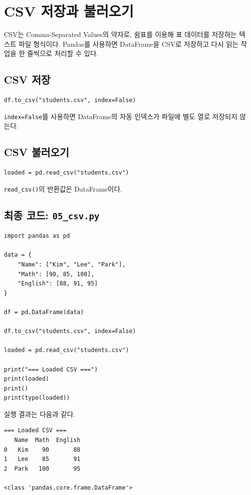 \documentclass[11pt,a4paper]{article}
\begin{document}
\section{CSV 저장과 불러오기}

CSV는 Comma-Separated Values의 약자로, 쉼표를 이용해 표 데이터를 저장하는 텍스트 파일 형식이다. Pandas를 사용하면 DataFrame을 CSV로 저장하고 다시 읽는 작업을 한 줄씩으로 처리할 수 있다.

\subsection{CSV 저장}

\begin{lstlisting}
df.to_csv("students.csv", index=False)
\end{lstlisting}

\texttt{index=False}를 사용하면 DataFrame의 자동 인덱스가 파일에 별도 열로 저장되지 않는다.

\subsection{CSV 불러오기}

\begin{lstlisting}
loaded = pd.read_csv("students.csv")
\end{lstlisting}

\texttt{read\_csv()}의 반환값은 DataFrame이다.

\subsection{최종 코드: \texttt{05\_csv.py}}

\begin{lstlisting}
import pandas as pd

data = {
    "Name": ["Kim", "Lee", "Park"],
    "Math": [90, 85, 100],
    "English": [88, 91, 95]
}

df = pd.DataFrame(data)

df.to_csv("students.csv", index=False)

loaded = pd.read_csv("students.csv")

print("=== Loaded CSV ===")
print(loaded)
print()
print(type(loaded))
\end{lstlisting}

실행 결과는 다음과 같다.

\begin{verbatim}
=== Loaded CSV ===
   Name  Math  English
0   Kim    90       88
1   Lee    85       91
2  Park   100       95

<class 'pandas.core.frame.DataFrame'>
\end{verbatim}
\end{document}
